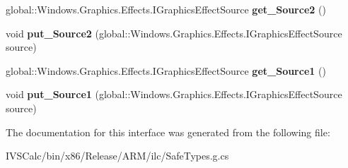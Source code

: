 \begin{DoxyCompactItemize}
global\+::\+Windows.\+Graphics.\+Effects.\+I\+Graphics\+Effect\+Source {\bfseries get\+\_\+\+Source2} ()
\item 
\mbox{\label{interface_microsoft_1_1_graphics_1_1_canvas_1_1_effects_1_1_i_cross_fade_effect_ae9a7ddede25c924649cded934e81b457}} 
void {\bfseries put\+\_\+\+Source2} (global\+::\+Windows.\+Graphics.\+Effects.\+I\+Graphics\+Effect\+Source source)
\item 
\mbox{\label{interface_microsoft_1_1_graphics_1_1_canvas_1_1_effects_1_1_i_cross_fade_effect_a6cf8a47d6e17902e59cbfba37f8bc6d4}} 
global\+::\+Windows.\+Graphics.\+Effects.\+I\+Graphics\+Effect\+Source {\bfseries get\+\_\+\+Source1} ()
\item 
\mbox{\label{interface_microsoft_1_1_graphics_1_1_canvas_1_1_effects_1_1_i_cross_fade_effect_aa61455b872f1f3db557618ac68112384}} 
void {\bfseries put\+\_\+\+Source1} (global\+::\+Windows.\+Graphics.\+Effects.\+I\+Graphics\+Effect\+Source source)
\end{DoxyCompactItemize}


The documentation for this interface was generated from the following file\+:\begin{DoxyCompactItemize}
\item 
I\+V\+S\+Calc/bin/x86/\+Release/\+A\+R\+M/ilc/Safe\+Types.\+g.\+cs\end{DoxyCompactItemize}
